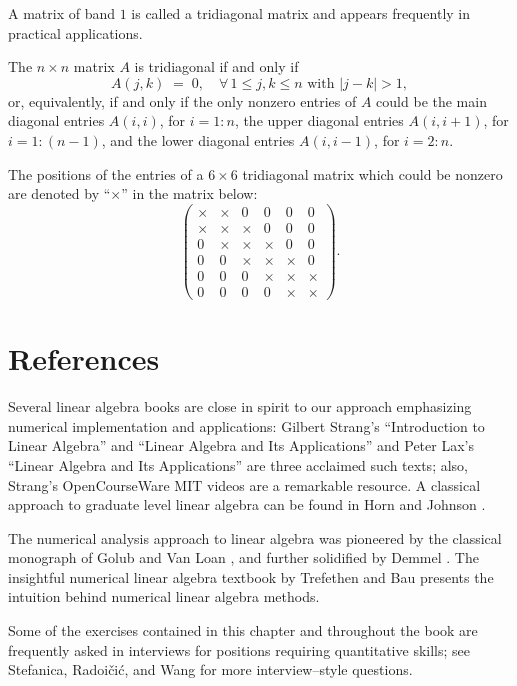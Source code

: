 
A matrix of band $1$ is called a tridiagonal matrix and appears frequently
in practical applications.

\begin{definition}
The $n\times n$ matrix $A$ is tridiagonal if and only if
\[
A(j,k) \;=\; 0, \quad \forall\, 1\le j,k\le n \text{ with } |j-k|>1,
\]
or, equivalently, if and only if the only nonzero entries of $A$ could be
the main diagonal entries $A(i,i)$, for $i=1:n$, the upper diagonal
entries $A(i,i+1)$, for $i=1:(n-1)$, and the lower diagonal entries
$A(i,i-1)$, for $i=2:n$.
\end{definition}

\begin{examplex}
The positions of the entries of a $6\times 6$ tridiagonal matrix which
could be nonzero are denoted by ``$\times$'' in the matrix below:
\[
\begin{pmatrix}
\times & \times & 0 & 0 & 0 & 0 \\
\times & \times & \times & 0 & 0 & 0 \\
0 & \times & \times & \times & 0 & 0 \\
0 & 0 & \times & \times & \times & 0 \\
0 & 0 & 0 & \times & \times & \times \\
0 & 0 & 0 & 0 & \times & \times
\end{pmatrix}.
\]
\end{examplex}

\section{References}

Several linear algebra books are close in spirit to our approach
emphasizing numerical implementation and applications: Gilbert Strang's
``Introduction to Linear Algebra'' \cite{41} and ``Linear Algebra and Its
Applications'' \cite{40} and Peter Lax's ``Linear Algebra and Its
Applications'' \cite{26} are three acclaimed such texts; also, Strang's
OpenCourseWare MIT videos are a remarkable resource. A classical approach
to graduate level linear algebra can be found in Horn and Johnson
\cite{22}.

The numerical analysis approach to linear algebra was pioneered by the
classical monograph of Golub and Van Loan \cite{18}, and further
solidified by Demmel \cite{13}. The insightful numerical linear algebra
textbook by Trefethen and Bau \cite{43} presents the intuition behind
numerical linear algebra methods.

Some of the exercises contained in this chapter and throughout the book
are frequently asked in interviews for positions requiring quantitative
skills; see Stefanica, Radoičić, and Wang \cite{39} for more
interview--style questions.
